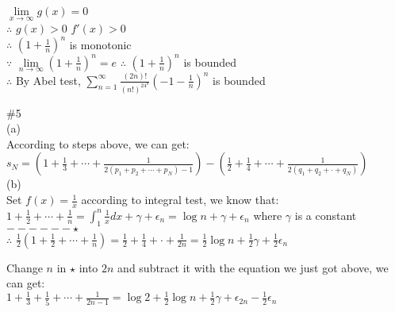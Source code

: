 \documentclass{article}
\begin{document}
$\displaystyle \lim \limits_{x \to \infty} g(x) = 0$\\

$\therefore$ \qquad $g(x)>0$ \quad $f'(x) > 0$\\

$\therefore$ \qquad $\displaystyle \left(1 + \frac{1}{n}\right)^n$ is monotonic\\

$\because$ \qquad $\displaystyle \lim \limits_{n \to \infty} \left(1 + \frac{1}{n}\right)^n = e$ \qquad $\therefore$ \qquad $\left(1 + \frac{1}{n}\right)^n$ \quad is bounded\\

$\therefore$ \qquad By Abel test, $\displaystyle \sum \limits_{n=1}^\infty \frac{(2n)!}{(n!)^24^n}\left(-1 - \frac{1}{n}\right)^n$ \quad is bounded\\

\vskip 3.8cm

\textcolor[rgb]{0.00,0.00,0.50}{\#5}\\

(a)\\

According to steps above, we can get:\\

$\displaystyle s_N = (1+\frac{1}{3}+\cdots+\frac{1}{2(p_1+p_2+\cdots+p_{N})-1})-(\frac{1}{2}+\frac{1}{4}+\cdots+\frac{1}{2(q_1+q_2+\cdot+q_N)})$\\

(b)\\

Set $f(x) = \frac{1}{x}$ \quad according to integral test, we know that:\\

$\displaystyle 1 + \frac{1}{2} + \cdots + \frac{1}{n}  = \int_1^n \frac{1}{x} dx + \gamma + \epsilon_n = \log{n} + \gamma + \epsilon_n$  where $\gamma$ is a constant \hskip 3cm$- - - - - -\star$\\

$\therefore$ \qquad $\displaystyle\frac{1}{2} \left(1 + \frac{1}{2} + \cdots + \frac{1}{n}\right) = \frac{1}{2} + \frac{1}{4} + \cdot + \frac{1}{2n} = \frac{1}{2} \log{n} + \frac{1}{2} \gamma + \frac{1}{2}\epsilon_n$

Change $n$ in $\star$ into $2n$ and subtract it with the equation we just got above, we can get:\\

$\displaystyle 1 + \frac{1}{3} + \frac{1}{5} + \cdots + \frac{1}{2n-1} = \log{2} + \frac{1}{2} \log{n} + \frac{1}{2} \gamma + \epsilon_{2n} - \frac{1}{2} \epsilon_n$\\
\end{document}
